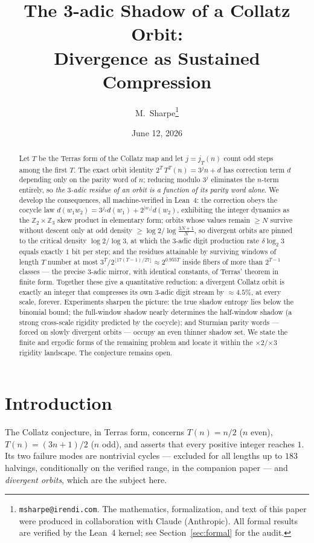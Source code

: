 \documentclass[11pt]{article}
\title{The 3-adic Shadow of a Collatz Orbit:\\
       Divergence as Sustained Compression}
\author{M.~Sharpe\thanks{\texttt{msharpe@irendi.com}. The mathematics,
  formalization, and text of this paper were produced in collaboration
  with Claude (Anthropic). All formal results are verified by the
  Lean~4 kernel; see Section~\ref{sec:formal} for the audit.}}
\date{June 12, 2026}
\newcommand{\Z}{\mathbb{Z}}
\newcommand{\Ztwo}{\Z_2}
\newcommand{\Zthree}{\Z_3}
\newcommand{\jodd}[2]{j_{#1}(#2)}
\begin{document}
\maketitle

\begin{abstract}
Let $T$ be the Terras form of the Collatz map and let $j = \jodd{T}{n}$
count odd steps among the first $T$. The exact orbit identity
$2^T\,T^T(n) = 3^{j} n + d$ has correction term $d$ depending only on
the parity word of $n$; reducing modulo $3^j$ eliminates the $n$-term
entirely, so \emph{the $3$-adic residue of an orbit is a function of
its parity word alone}. We develop the consequences, all machine-verified
in Lean~4: the correction obeys the cocycle law
$d(w_1 w_2) = 3^{j_2} d(w_1) + 2^{|w_1|} d(w_2)$, exhibiting the
integer dynamics as the $\Ztwo \times \Zthree$ skew product in
elementary form; orbits whose values remain $\ge N$ survive without
descent only at odd density $\ge \log 2 / \log\frac{3N+1}{N}$, so
divergent orbits are pinned to the critical density
$\log 2/\log 3$, at which the $3$-adic digit production rate
$\delta \log_2 3$ equals exactly $1$ bit per step; and the residues
attainable by surviving windows of length $T$ number at most
$3^T / 2^{\lfloor 17(T-1)/27\rfloor} \approx 2^{0.955T}$ inside fibers
of more than $2^{T-1}$ classes --- the precise $3$-adic mirror, with
identical constants, of Terras' theorem in finite form. Together these
give a quantitative reduction: a divergent Collatz orbit is exactly an
integer that compresses its own $3$-adic digit stream by
$\approx 4.5\%$, at every scale, forever. Experiments sharpen the
picture: the true shadow entropy lies below the binomial bound; the
full-window shadow nearly determines the half-window shadow (a strong
cross-scale rigidity predicted by the cocycle); and Sturmian parity
words --- forced on slowly divergent orbits --- occupy an even thinner
shadow set. We state the finite and ergodic forms of the remaining
problem and locate it within the $\times 2$/$\times 3$ rigidity
landscape. The conjecture remains open.
\end{abstract}

\section{Introduction}

The Collatz conjecture, in Terras form, concerns
$T(n) = n/2$ ($n$ even), $T(n) = (3n+1)/2$ ($n$ odd), and asserts that
every positive integer reaches $1$. Its two failure modes are
nontrivial cycles --- excluded for all lengths up to $183$ halvings,
conditionally on the verified range, in the companion paper
\cite{companion} --- and \emph{divergent orbits}, which are the subject
here.
\end{document}
